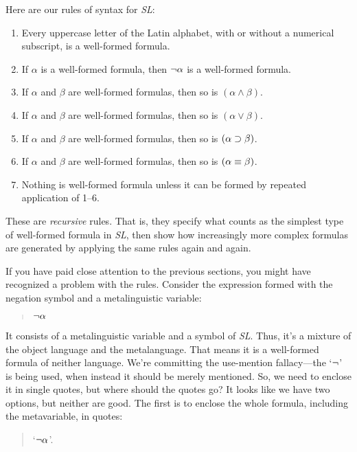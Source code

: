 \documentclass[../logic-text.tex]{subfiles}
\begin{document}
Here are our rules of syntax for \emph{SL}:

\begin{enumerate}
  \item Every uppercase letter of the Latin alphabet, with or without a numerical subscript, is a well-formed formula.
  \item If \(\alpha\) is a well-formed formula, then \(\neg \alpha\) is a well-formed formula.
  \item If \(\alpha\) and \(\beta\) are well-formed formulas, then so is \((\alpha \land \beta)\).
  \item If \(\alpha\) and \(\beta\) are well-formed formulas, then so is \((\alpha \lor \beta)\).
  \item If \(\alpha\) and \(\beta\) are well-formed formulas, then so is \((\alpha \supset \beta)\).
  \item If \(\alpha\) and \(\beta\) are well-formed formulas, then so is \((\alpha \equiv \beta)\).
  \item Nothing is well-formed formula unless it can be formed by repeated application of 1--6.
\end{enumerate}

These are \emph{recursive} rules. That is, they specify what counts as the simplest type of well-formed formula in \emph{SL}, then show how increasingly more complex formulas are generated by applying the same rules again and again.

If you have paid close attention to the previous sections, you might have recognized a problem with the rules. Consider the expression formed with the negation symbol and a metalinguistic variable: 
\begin{quote}
\(\neg\alpha\)
\end{quote}

It consists of a metalinguistic variable and a symbol of \emph{SL}. Thus, it's a mixture of the object language and the  metalanguage. That means it is a well-formed formula of neither language. We're committing the use-mention fallacy---the \enquote*{\(\neg\)} is being used, when instead it should be merely mentioned. So, we need to enclose it in single quotes, but where should the quotes go? It looks like we have two options, but neither are good. The first is to enclose the whole formula, including the metavariable, in quotes:

\begin{quote}
\enquote*{\(\neg\alpha\)}.    
\end{quote}
\end{document}
